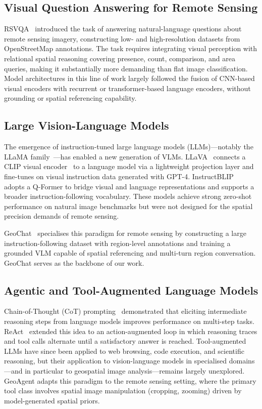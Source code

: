 \documentclass{article}
\begin{document}
\subsection{Visual Question Answering for Remote Sensing}

RSVQA~\citep{lobry2020rsvqa} introduced the task of answering natural-language
questions about remote sensing imagery, constructing low- and high-resolution
datasets from OpenStreetMap annotations.  The task requires integrating visual
perception with relational spatial reasoning covering presence, count, comparison,
and area queries, making it substantially more demanding than flat image
classification.  Model architectures in this line of work largely followed the
fusion of CNN-based visual encoders with recurrent or transformer-based language
encoders, without grounding or spatial referencing capability.

\subsection{Large Vision-Language Models}

The emergence of instruction-tuned large language models (LLMs)---notably the
LLaMA family~\citep{touvron2023llama}---has enabled a new generation of VLMs.
LLaVA~\citep{liu2023llava} connects a CLIP visual encoder~\citep{radford2021clip}
to a language model via a lightweight projection layer and fine-tunes on visual
instruction data generated with GPT-4.  InstructBLIP~\citep{dai2023instructblip}
adopts a Q-Former to bridge visual and language representations and supports a
broader instruction-following vocabulary.  These models achieve strong zero-shot
performance on natural image benchmarks but were not designed for the spatial
precision demands of remote sensing.

GeoChat~\citep{kuckreja2024geochat} specialises this paradigm for remote sensing by
constructing a large instruction-following dataset with region-level annotations
and training a grounded VLM capable of spatial referencing and multi-turn region
conversation.  GeoChat serves as the backbone of our work.

\subsection{Agentic and Tool-Augmented Language Models}

Chain-of-Thought (CoT) prompting~\citep{wei2022chain} demonstrated that eliciting
intermediate reasoning steps from language models improves performance on multi-step
tasks.  ReAct~\citep{yao2023react} extended this idea to an action-augmented loop
in which reasoning traces and tool calls alternate until a satisfactory answer is
reached.  Tool-augmented LLMs have since been applied to web browsing, code
execution, and scientific reasoning, but their application to vision-language models
in specialised domains---and in particular to geospatial image analysis---remains
largely unexplored.  GeoAgent adapts this paradigm to the remote sensing setting,
where the primary tool class involves spatial image manipulation (cropping, zooming)
driven by model-generated spatial priors.
\end{document}
